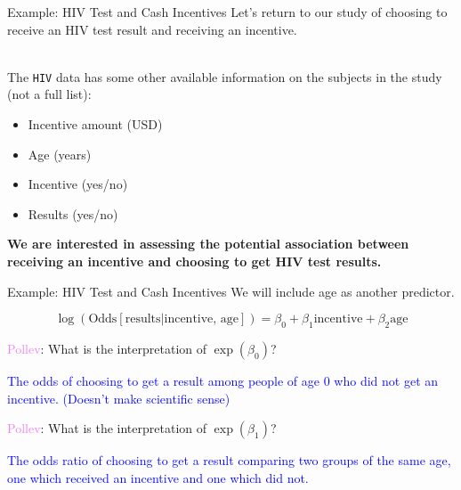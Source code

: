\documentclass[10pt,t]{beamer}
\begin{document}
\begin{frame}{Example: HIV Test and Cash Incentives}
	Let's return to our study of choosing to receive an HIV test result and receiving an incentive.
	\\ ~\
	
	The \texttt{HIV} data has some other available information on the subjects in the study (not a full list):
	\medskip
	\begin{itemize}
		\item Incentive amount (USD)
		\item Age (years)
		\item Incentive (yes/no)
		\item Results (yes/no)
	\end{itemize}
\medskip  

	\textbf{We are interested in assessing the potential association between receiving an incentive and choosing to get HIV test results.} 
\end{frame}

\begin{frame}{Example: HIV Test and Cash Incentives}
	We will include age as another predictor.
	
	$$\log\left(\text{Odds}[\text{results} |\text{incentive, age}]\right) = \beta_0 + \beta_1 \text{incentive} + \beta_2\text{age}$$

\medskip

\textcolor{violet}{Pollev}: What is the interpretation of $\exp(\beta_0)$?
\bigskip

\textcolor{blue}{The odds of choosing to get a result among people of age 0 who did not get an incentive. (Doesn't make scientific sense)}
\bigskip


\textcolor{violet}{Pollev}: What is the interpretation of $\exp(\beta_1)$?
\bigskip

\textcolor{blue}{The odds ratio of choosing to get a result comparing two groups of the same age, one which received an incentive and one which did not.}

\end{frame}
\end{document}
